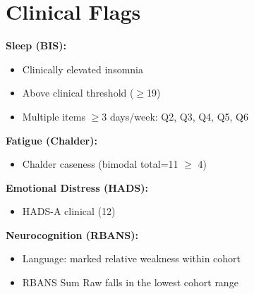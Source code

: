 \documentclass[11pt,a4paper]{article}
\begin{document}
\section{Clinical Flags}
\textbf{Sleep (BIS):}
\begin{itemize}[leftmargin=2em, topsep=0pt]
  \item Clinically elevated insomnia
  \item Above clinical threshold ($\geq$19)
  \item Multiple items $\geq$3 days/week: Q2, Q3, Q4, Q5, Q6
\end{itemize}
\textbf{Fatigue (Chalder):}
\begin{itemize}[leftmargin=2em, topsep=0pt]
  \item Chalder caseness (bimodal total=11 $\geq$ 4)
\end{itemize}
\textbf{Emotional Distress (HADS):}
\begin{itemize}[leftmargin=2em, topsep=0pt]
  \item HADS-A clinical (12)
\end{itemize}
\textbf{Neurocognition (RBANS):}
\begin{itemize}[leftmargin=2em, topsep=0pt]
  \item Language: marked relative weakness within cohort
  \item RBANS Sum Raw falls in the lowest cohort range
\end{itemize}


\end{document}
